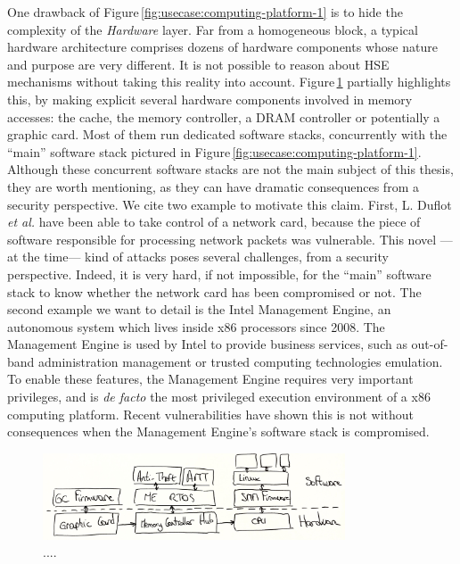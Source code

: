 One drawback of Figure\,\ref{fig:usecase:computing-platform-1} is to hide the
complexity of the \emph{Hardware} layer.
%
Far from a homogeneous block, a typical hardware architecture comprises dozens
of hardware components whose nature and purpose are very different.
%
It is not possible to reason about HSE mechanisms without taking this reality
into account.
%
Figure\,\ref{fig:usecase:computing-platform-2} partially highlights this, by
making explicit several hardware components involved in memory accesses: the
cache, the memory controller, a DRAM controller or potentially a graphic card.
%
Most of them run dedicated software stacks, concurrently with the ``main''
software stack pictured in Figure\,\ref{fig:usecase:computing-platform-1}.
%
Although these concurrent software stacks are not the main subject of this
thesis, they are worth mentioning, as they can have dramatic consequences from a
security perspective.
%
We cite two example to motivate this claim.
%
First, L. Duflot \emph{et al.} have been able to take control of a network card,
because the piece of software responsible for processing network packets was
vulnerable.
%
This novel ---at the time--- kind of attacks poses several challenges, from a
security perspective.
%
Indeed, it is very hard, if not impossible, for the ``main'' software stack to
know whether the network card has been compromised or not.
%
The second example we want to detail is the Intel Management Engine, an
autonomous system which lives inside x86 processors since 2008.
%
The Management Engine is used by Intel to provide business services, such as
out-of-band administration management or trusted computing technologies
emulation.
%
To enable these features, the Management Engine requires very important
privileges, and is \emph{de facto} the most privileged execution environment of
a x86 computing platform.
%
Recent vulnerabilities have shown this is not without consequences when the
Management Engine's software stack is compromised.

\begin{figure}
  \centering
  \includegraphics[width=0.8\textwidth]{Figures/intro-computing-platform.jpg}
  \caption{....}
  \label{fig:usecase:computing-platform-2}
\end{figure}

